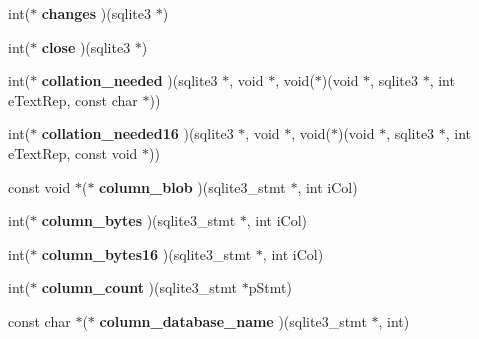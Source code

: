 \begin{DoxyCompactItemize}
int($\ast$ {\bfseries changes} )(sqlite3 $\ast$)
\item 
\mbox{\label{structsqlite3__api__routines_a5c30292eef0130d7e8a408c4e3396012}} 
int($\ast$ {\bfseries close} )(sqlite3 $\ast$)
\item 
\mbox{\label{structsqlite3__api__routines_a4ecc8645b639cabe1fb630aceaec9017}} 
int($\ast$ {\bfseries collation\+\_\+needed} )(sqlite3 $\ast$, void $\ast$, void($\ast$)(void $\ast$, sqlite3 $\ast$, int e\+Text\+Rep, const char $\ast$))
\item 
\mbox{\label{structsqlite3__api__routines_aa035538977ec61fe6df923b78db33962}} 
int($\ast$ {\bfseries collation\+\_\+needed16} )(sqlite3 $\ast$, void $\ast$, void($\ast$)(void $\ast$, sqlite3 $\ast$, int e\+Text\+Rep, const void $\ast$))
\item 
\mbox{\label{structsqlite3__api__routines_aea28365a58adb937fbdf3983fe080e1a}} 
const void $\ast$($\ast$ {\bfseries column\+\_\+blob} )(sqlite3\+\_\+stmt $\ast$, int i\+Col)
\item 
\mbox{\label{structsqlite3__api__routines_a4925c38851818eebce76de641da69636}} 
int($\ast$ {\bfseries column\+\_\+bytes} )(sqlite3\+\_\+stmt $\ast$, int i\+Col)
\item 
\mbox{\label{structsqlite3__api__routines_a7355fc82d2138b79b2e188fd2de4d269}} 
int($\ast$ {\bfseries column\+\_\+bytes16} )(sqlite3\+\_\+stmt $\ast$, int i\+Col)
\item 
\mbox{\label{structsqlite3__api__routines_a3a41d82a8b13513a505889c8c9b1c97e}} 
int($\ast$ {\bfseries column\+\_\+count} )(sqlite3\+\_\+stmt $\ast$p\+Stmt)
\item 
\mbox{\label{structsqlite3__api__routines_acd92d7b8700122a8c352d9f03c8fad37}} 
const char $\ast$($\ast$ {\bfseries column\+\_\+database\+\_\+name} )(sqlite3\+\_\+stmt $\ast$, int)
\item 
\mbox{\label{structsqlite3__api__routines_a3e38edb955dbd932717bb11283b65490}} 

\end{DoxyCompactItemize}
